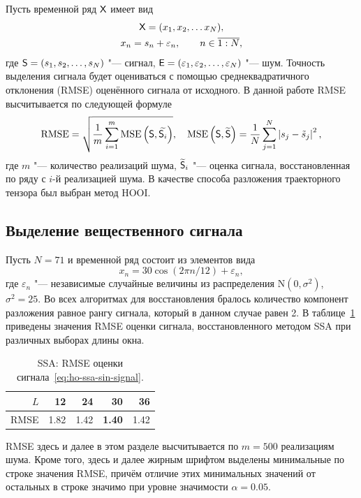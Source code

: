 \documentclass[specialist,
  substylefile=spbu_report.rtx,
subf,href,colorlinks=true, 12pt]{disser}
\theoremstyle{plain}
\theoremstyle{definition}
\theoremstyle{remark}
\begin{document}
Пусть временной ряд $\mathsf{X}$ имеет вид
\begin{gather*}
  \mathsf{X} = (x_1, x_2,\ldots x_{N}), \\
  x_n = s_n + \varepsilon_n, \qquad n\in \overline{1:N},
\end{gather*}
где $\mathsf{S} = (s_1, s_2, \ldots, s_N)$ "--- сигнал,
$\mathsf{E} = (\varepsilon_1, \varepsilon_2, \ldots, \varepsilon_N)$ "--- шум.
Точность выделения сигнала будет оцениваться с помощью
среднеквадратичного отклонения (RMSE)
оценённого сигнала от исходного.
В данной работе RMSE высчитывается по следующей формуле
\begin{equation*}
  \text{RMSE} = \sqrt{\frac{1}{m} \sum_{i=1}^{m} \text{MSE}\left(\mathsf{S},
  \widetilde{\mathsf{S}_i}\right)},
  \quad \text{MSE}\left(\mathsf{S}, \widetilde{\mathsf{S}} \right) = \frac{1}{N}
  \sum_{j=1}^{N}\left|s_j - \tilde{s}_j\right|^2,
\end{equation*}
где $m$ "--- количество реализаций шума, $\widetilde{\mathsf{S}}_i$ "---
оценка сигнала,
восстановленная по ряду с $i$-й реализацией шума.
В качестве способа разложения траекторного тензора был выбран метод HOOI.

\subsection{Выделение вещественного сигнала}\label{subsec:comparison}
Пусть $N = 71$ и временной ряд состоит из элементов вида
\begin{equation}
  \label{eq:ho-ssa-sin-signal}
  x_n = 30\cos(2\pi n/12) + \varepsilon_n,
\end{equation}
где $\varepsilon_n$ "--- независимые случайные величины из
распределения $\mathrm{N}(0, \sigma^2)$,
$\sigma^2=25$.
Во всех алгоритмах для восстановления бралось количество компонент
разложения равное рангу сигнала,
который в данном случае равен 2.
В таблице~\ref{tab:ssa-cos} приведены значения RMSE оценки сигнала,
восстановленного
методом SSA при различных выборах длины окна.
\begin{table}[!ht]
  \centering
  \caption{SSA: RMSE оценки сигнала~\eqref{eq:ho-ssa-sin-signal}.}
  \begin{tabular}{|r|r|r|r|r|}
    \hline
    $L$ &   12 &   24 &            30 &   36 \\ \hline
    RMSE & 1.82 & 1.42 & \textbf{1.40} & 1.42 \\ \hline
  \end{tabular}\label{tab:ssa-cos}
\end{table}
RMSE здесь и далее в этом разделе высчитывается по $m=500$ реализациям шума.
Кроме того, здесь и далее жирным шрифтом выделены минимальные по
строке значения RMSE, причём
отличие этих минимальных значений от остальных в строке значимо при
уровне значимости $\alpha = 0.05$.
\end{document}
